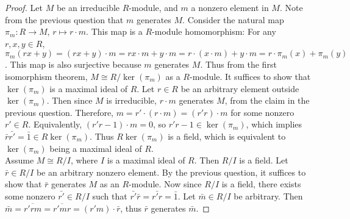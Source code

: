 \documentclass{article}
\begin{document}
  \begin{proof}
    Let $M$ be an irreducible $R$-module, and $m$ a nonzero element in $M$.
    Note from the previous question that $m$ generates $M$. Consider the
    natural map $\pi_m:R\rightarrow M$, $r\mapsto r\cdot m$. This map is
    a $R$-module homomorphism: For any $r,x,y\in R$,
    $\pi_m(rx+y)=(rx+y)\cdot m=rx\cdot m+y\cdot m =r\cdot(x\cdot m)+y\cdot
    m =r\cdot\pi_m(x)+\pi_m(y)$. This map is also surjective because $m$
    generates $M$. Thus from the first isomorphism theorem, $M\cong
    R/\ker(\pi_m)$ as a $R$-module. It suffices to show that $\ker(\pi_m)$
    is a maximal ideal of $R$. Let $r\in R$ be an arbitrary element outside
    $\ker(\pi_m)$. Then since $M$ is irreducible, $r\cdot m$ generates $M$,
    from the claim in the previous question. Therefore, $m=r'\cdot(r\cdot
    m)=(r'r)\cdot m$ for some nonzero $r'\in R$. Equivalently,
    $(r'r-1)\cdot m=0$, so $r'r-1\in\ker(\pi_m)$, which implies
    $\bar{r}\bar{r'}=\bar{1}\in R\ker(\pi_m)$. Thus $R\ker(\pi_m)$ is a
    field, which is equivalent to $\ker(\pi_m)$ being a maximal ideal of
    $R$. \\

    Assume $M\cong R/I$, where $I$ is a maximal ideal of $R$. Then $R/I$ is
    a field. Let $\bar{r}\in R/I$ be an arbitrary nonzero element. By the
    previous question, it suffices to show that $\bar{r}$ generates $M$ as
    an $R$-module. Now since $R/I$ is a field, there exists some nonzero
    $\bar{r'}\in R/I$ such that $\bar{r'}\bar{r}=\bar{r'r}=\bar{1}$. Let
    $\bar{m}\in R/I$ be arbitrary. Then
    $\bar{m}=\overline{r'rm}=\overline{r'mr}=(r'm)\cdot\bar{r}$, thus
    $\bar{r}$ generates $\bar{m}$.
  \end{proof}
\end{document}
